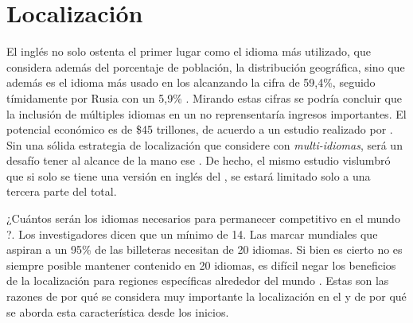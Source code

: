 \section{Localización}

El inglés no solo ostenta el primer lugar como el idioma más utilizado, \rankingCPT que considera además del porcentaje de población, la distribución geográfica, sino que además es el idioma más usado en los \websitesINT alcanzando la cifra de 59,4\%, seguido tímidamente por Rusia con un 5,9\% \cite{online_world_wide_languages}. Mirando estas cifras se podría concluir que la inclusión de múltiples idiomas en un \siteINT \ecommerceCOM	no reprensentaría ingresos importantes.
El potencial económico \online es de \$45 trillones, de acuerdo a un estudio realizado por \commonSenseAdvisoryNAME \cite{online_world_global_oportunity_multi_languages}.  Sin una sólida estrategia de localización que considere \websitesINT \ecommerceCOM con \textit{multi-idiomas}, será  un desafío tener al alcance de la mano ese \revenueCOM. De hecho, el mismo estudio vislumbró que si solo se tiene una versión en inglés del \siteINT, se estará limitado solo a una tercera parte del total.


¿Cuántos serán los idiomas necesarios para permanecer competitivo en el mundo \online?. Los investigadores dicen que un mínimo de 14. Las marcar mundiales que aspiran a un 95\% de las billeteras \online necesitan de 20 idiomas. Si bien es cierto no es siempre posible mantener contenido \online en 20 idiomas, es difícil negar los beneficios de la localización para regiones específicas alrededor del mundo \cite{online_world_global_oportunity_multi_languages}. Estas son las razones de por qué se considera muy importante la localización en el \frameworkPC y de por qué se aborda esta característica desde los inicios.

